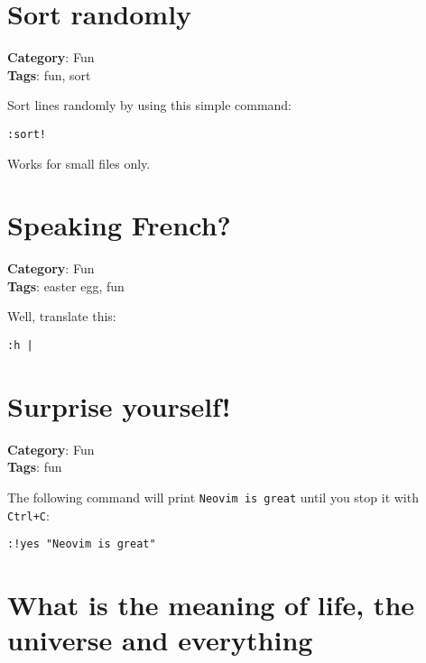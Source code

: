 {{{{{{\section{Sort randomly}

\textbf{Category}: Fun\\ \textbf{Tags}: fun, sort
\vspace{0.5cm}

Sort lines randomly by using this simple command:

\begin{Exa*}{}
\begin{Verbatim}[fontsize=\footnotesize, breaklines, breakanywhere]
:sort!
\end{Verbatim}
\end{Exa*}

Works for small files only.

\section{Speaking French?}

\textbf{Category}: Fun\\ \textbf{Tags}: easter egg, fun
\vspace{0.5cm}

Well, translate this:

\begin{Exa*}{}
\begin{Verbatim}[fontsize=\footnotesize, breaklines, breakanywhere]
:h |
\end{Verbatim}
\end{Exa*}

\section{Surprise yourself!}

\textbf{Category}: Fun\\ \textbf{Tags}: fun
\vspace{0.5cm}

The following command will print {\footnotesize \Verb§Neovim is great§} until you stop it with {\footnotesize \Verb§Ctrl+C§}:

\begin{Exa*}{}
\begin{Verbatim}[fontsize=\footnotesize, breaklines, breakanywhere]
:!yes "Neovim is great"
\end{Verbatim}
\end{Exa*}

\section{What is the meaning of life, the universe and everything}

}}}}}}
